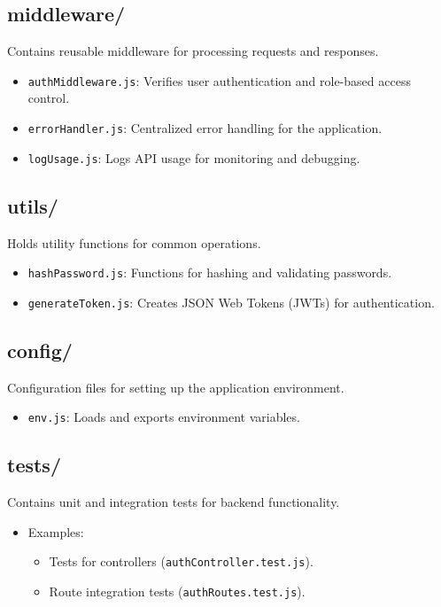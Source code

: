 \subsection{middleware/}
Contains reusable middleware for processing requests and responses.
\begin{itemize}
    \item \texttt{authMiddleware.js}: Verifies user authentication and role-based access control.
    \item \texttt{errorHandler.js}: Centralized error handling for the application.
    \item \texttt{logUsage.js}: Logs API usage for monitoring and debugging.
\end{itemize}

\subsection{utils/}
Holds utility functions for common operations.
\begin{itemize}
    \item \texttt{hashPassword.js}: Functions for hashing and validating passwords.
    \item \texttt{generateToken.js}: Creates JSON Web Tokens (JWTs) for authentication.
\end{itemize}

\subsection{config/}
Configuration files for setting up the application environment.
\begin{itemize}
    \item \texttt{env.js}: Loads and exports environment variables.
\end{itemize}

\subsection{tests/}
Contains unit and integration tests for backend functionality.
\begin{itemize}
    \item Examples:
    \begin{itemize}
        \item Tests for controllers (\texttt{authController.test.js}).
        \item Route integration tests (\texttt{authRoutes.test.js}).
    \end{itemize}
\end{itemize}

